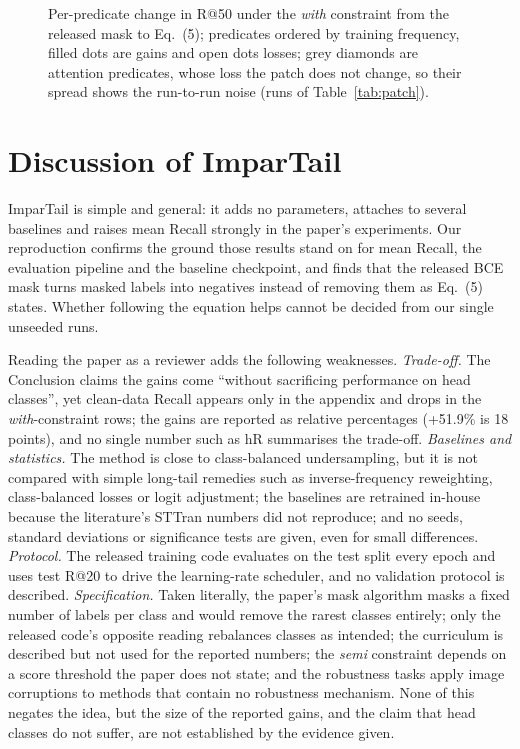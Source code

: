 \documentclass[conference,a4paper]{IEEEtran}
\begin{document}
\begin{figure}[!t]
\centering
\resizebox{\columnwidth}{!}{}
\caption{Per-predicate change in R@50 under the \emph{with} constraint from the released mask to Eq.~(5); predicates ordered by training frequency, filled dots are gains and open dots losses; grey diamonds are attention predicates, whose loss the patch does not change, so their spread shows the run-to-run noise (runs of Table~\ref{tab:patch}).}
\label{fig:perclass}
\end{figure}

\section{Discussion of ImparTail}
ImparTail is simple and general: it adds no parameters, attaches to several baselines and
raises mean Recall strongly in the paper's experiments. Our reproduction confirms the ground
those results stand on for mean Recall, the evaluation pipeline and the baseline
checkpoint, and finds that the released BCE mask turns masked labels into negatives instead
of removing them as Eq.~(5) states. Whether following the equation helps cannot be decided
from our single unseeded runs.

Reading the paper as a reviewer adds the following weaknesses. \emph{Trade-off.} The
Conclusion claims the gains come ``without sacrificing performance on head classes'', yet
clean-data Recall appears only in the appendix and drops in the \emph{with}-constraint rows;
the gains are reported as relative percentages (+51.9\% is 18 points), and no single number
such as hR summarises the trade-off. \emph{Baselines and statistics.} The method is close to
class-balanced undersampling, but it is not compared with simple long-tail remedies such as
inverse-frequency reweighting, class-balanced losses or logit adjustment; the baselines are
retrained in-house because the literature's STTran numbers did not reproduce; and no seeds,
standard deviations or significance tests are given, even for small differences. \emph{Protocol.} The released training code evaluates on the test split
every epoch and uses test R@20 to drive the learning-rate scheduler, and no validation
protocol is described. \emph{Specification.} Taken literally, the paper's mask algorithm
masks a fixed number of labels per class and would remove the rarest classes entirely;
only the released code's opposite reading rebalances classes as intended; the curriculum is described but not used for the reported numbers;
the \emph{semi} constraint depends on a score threshold the paper does not state; and the
robustness tasks apply image corruptions to methods that contain no robustness mechanism.
None of this negates the idea, but the size of the reported gains, and the claim that head
classes do not suffer, are not established by the evidence given.
\end{document}
